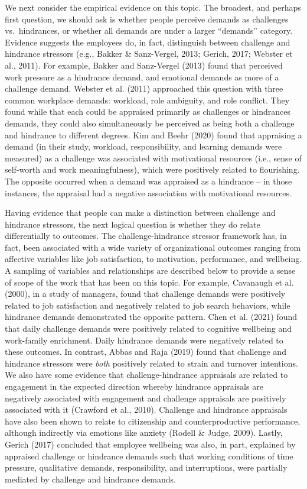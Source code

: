 \documentclass[
  man]{apa6}
\begin{document}
We next consider the empirical evidence on this topic. The broadest, and perhaps first question, we should ask is whether people perceive demands as challenges vs.~hindrances, or whether all demands are under a larger ``demands'' category. Evidence suggests the employees do, in fact, distinguish between challenge and hindrance stressors (e.g., Bakker \& Sanz-Vergel, 2013; Gerich, 2017; Webster et al., 2011). For example, Bakker and Sanz-Vergel (2013) found that perceived work pressure as a hindrance demand, and emotional demands as more of a challenge demand. Webster et al. (2011) approached this question with three common workplace demands: workload, role ambiguity, and role conflict. They found while that each could be appraised primarily as challenges or hindrances demands, they could also simultaneously be perceived as being both a challenge and hindrance to different degrees. Kim and Beehr (2020) found that appraising a demand (in their study, workload, responsibility, and learning demands were measured) as a challenge was associated with motivational resources (i.e., sense of self-worth and work meaningfulness), which were positively related to flourishing. The opposite occurred when a demand was appraised as a hindrance -- in those instances, the appraisal had a negative association with motivational resources.

Having evidence that people can make a distinction between challenge and hindrance stressors, the next logical question is whether they do relate differentially to outcomes. The challenge-hindrance stressor framework has, in fact, been associated with a wide variety of organizational outcomes ranging from affective variables like job satisfaction, to motivation, performance, and wellbeing. A sampling of variables and relationships are described below to provide a sense of scope of the work that has been on this topic. For example, Cavanaugh et al. (2000), in a study of managers, found that challenge demands were positively related to job satisfaction and negatively related to job search behaviors, while hindrance demands demonstrated the opposite pattern. Chen et al. (2021) found that daily challenge demands were positively related to cognitive wellbeing and work-family enrichment. Daily hindrance demands were negatively related to these outcomes. In contrast, Abbas and Raja (2019) found that challenge and hindrance stressors were \emph{both} positively related to strain and turnover intentions. We also have some evidence that challenge-hindrance appraisals are related to engagement in the expected direction whereby hindrance appraisals are negatively associated with engagement and challenge appraisals are positively associated with it (Crawford et al., 2010). Challenge and hindrance appraisals have also been shown to relate to citizenship and counterproductive performance, although indirectly via emotions like anxiety (Rodell \& Judge, 2009). Lastly, Gerich (2017) concluded that employee wellbeing was also, in part, explained by appraised challenge or hindrance demands such that working conditions of time pressure, qualitative demands, responsibility, and interruptions, were partially mediated by challenge and hindrance demands.
\end{document}
